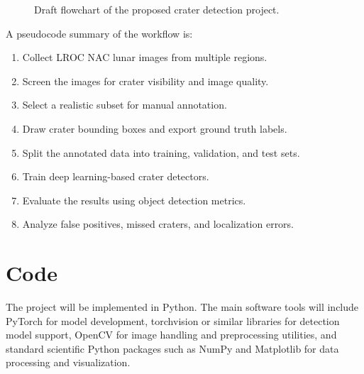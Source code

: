 \documentclass[conference]{IEEEtran}
\begin{document}
	\begin{figure}[htbp]
		\centering
		\caption{Draft flowchart of the proposed crater detection project.}
		\label{fig:flowchart}
	\end{figure}
	
	A pseudocode summary of the workflow is:
	\begin{enumerate}
		\item Collect LROC NAC lunar images from multiple regions.
		\item Screen the images for crater visibility and image quality.
		\item Select a realistic subset for manual annotation.
		\item Draw crater bounding boxes and export ground truth labels.
		\item Split the annotated data into training, validation, and test sets.
		\item Train deep learning-based crater detectors.
		\item Evaluate the results using object detection metrics.
		\item Analyze false positives, missed craters, and localization errors.
	\end{enumerate}
	
	\section{Code}
	The project will be implemented in Python. The main software tools will include PyTorch for model development, torchvision or similar libraries for detection model support, OpenCV for image handling and preprocessing utilities, and standard scientific Python packages such as NumPy and Matplotlib for data processing and visualization.
	
\end{document}
